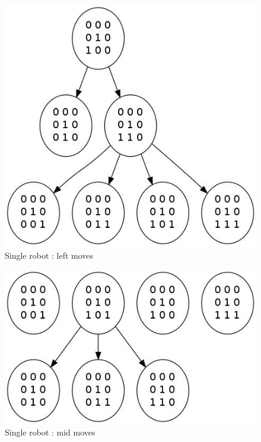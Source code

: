 \documentclass[11pt, a4paper]{article}
\theoremstyle{plain}
\theoremstyle{definition}
\theoremstyle{remark}
\begin{document}
\begin{figure}
\includegraphics[scale=0.50]{graph_single_left.jpg}
\caption{Single robot : left moves}
\label{graph:single_left}
\end{figure}

\begin{figure}
\includegraphics[scale=0.50]{graph_single_mid.jpg}
\caption{Single robot : mid moves}
\label{graph:mid}
\end{figure}
\end{document}
